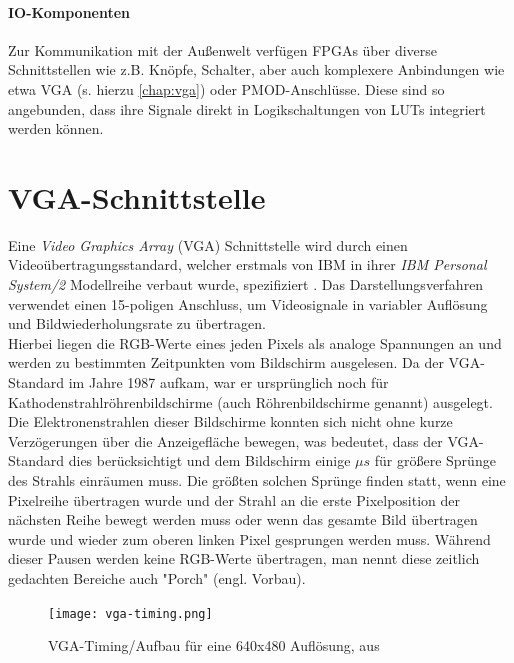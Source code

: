 \documentclass[a4paper,12pt,onesided]{report}
\begin{document}
\paragraph{IO-Komponenten}
Zur Kommunikation mit der Außenwelt verfügen FPGAs über diverse Schnittstellen wie z.B. Knöpfe, Schalter, aber auch komplexere Anbindungen wie etwa VGA (s. hierzu \autoref{chap:vga}) oder PMOD-Anschlüsse. %
Diese sind so angebunden, dass ihre Signale direkt in Logikschaltungen von LUTs integriert werden können.


\section{VGA-Schnittstelle}
\label{chap:vga}
Eine \textit{Video Graphics Array} (VGA) Schnittstelle wird durch einen Videoübertragungsstandard, welcher erstmals von IBM in ihrer \textit{IBM Personal System/2} Modellreihe verbaut wurde, spezifiziert \cite{ibmTimeline}. 
Das Darstellungsverfahren verwendet einen 15-poligen Anschluss, um Videosignale in variabler Auflösung und Bildwiederholungsrate zu übertragen.\\
Hierbei liegen die RGB-Werte eines jeden Pixels als analoge Spannungen an und werden zu bestimmten Zeitpunkten vom Bildschirm ausgelesen. 
Da der VGA-Standard im Jahre 1987 aufkam, war er ursprünglich noch für  Kathodenstrahlröhrenbildschirme (auch Röhrenbildschirme genannt) ausgelegt. 
Die Elektronenstrahlen dieser Bildschirme konnten sich nicht ohne kurze Verzögerungen über die Anzeigefläche bewegen, was bedeutet, dass der VGA-Standard dies berücksichtigt und dem Bildschirm einige $\mu s$ für größere Sprünge des Strahls einräumen muss.
Die größten solchen Sprünge finden statt, wenn eine Pixelreihe übertragen wurde und der Strahl an die erste Pixelposition der nächsten Reihe bewegt werden muss oder wenn das gesamte Bild übertragen wurde und wieder zum oberen linken Pixel gesprungen werden muss.
Während dieser Pausen werden keine RGB-Werte übertragen, man nennt diese zeitlich gedachten Bereiche auch "Porch" (engl. Vorbau).\\

\begin{figure}[H]
	\centering
	\texttt{[image: vga-timing.png]}
	\caption{VGA-Timing/Aufbau für eine 640x480 Auflösung, aus \cite{vga-timing}}
	\label{fig:vga}
\end{figure}
\end{document}
